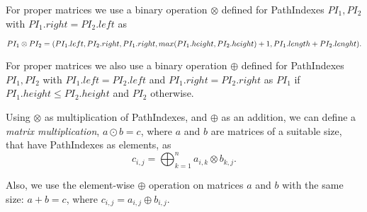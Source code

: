 For proper matrices we use a binary operation $\otimes$ defined for PathIndexes \mbox{$PI_1, PI_2$} with $PI_1.right = PI_2.left$ as 

$PI_1 \otimes PI_2 = (PI_1.left, PI_2.right, PI_1.right, \\ max(PI_1.height, PI_2.height)+1,PI_1.length + PI_2.lenght).$

For proper matrices we also use a binary operation $\oplus$ defined for PathIndexes \mbox{$PI_1, PI_2$} with $PI_1.left = PI_2.left$ and $PI_1.right = PI_2.right$ as $PI_1$ if $PI_1.height \leq PI_2.height$ and $PI_2$ otherwise.

Using $\otimes$ as multiplication of PathIndexes, and $\oplus$ as an addition, we can define a \emph{matrix multiplication}, \mbox{$a \odot b = c$}, where $a$ and $b$ are matrices of a suitable size, that have PathIndexes as elements, as $$c_{i,j} = \bigoplus^{n}_{k=1}{a_{i,k} \otimes b_{k,j}}.$$

Also, we use the element-wise $\oplus$ operation on matrices $a$ and $b$ with the same size: \mbox{$a + b = c$}, where $c_{i,j} = a_{i,j} \oplus b_{i,j}.$
